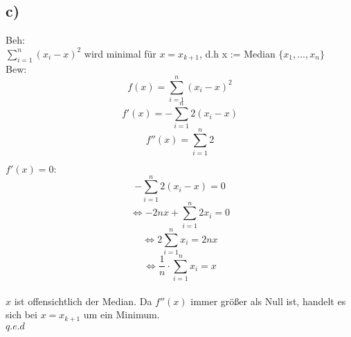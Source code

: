 \documentclass[a4paper,11pt,twoside]{article}
\begin{document}
\subsection*{c)}

Beh:\\ $\sum_{i=1}^{n} (x_i-x)^2$ wird minimal für $x = x_{k+1}$, d.h x := Median $\{x_1, ..., x_n\}$\\

Bew: \\
\[f(x) = \sum_{i=1}^{n} (x_i -x)^2\]
\[f'(x) = -\sum_{i=1}^{n} 2(x_i -x)\]
\[f''(x) = \sum_{i=1}^{n} 2\]

\underline{$f'(x)=0:$}\\
\[-\sum_{i=1}^{n}2(x_i -x) = 0\]
\[\Leftrightarrow -2nx + \sum_{i=1}^{n}2x_i = 0\]
\[\Leftrightarrow 2\sum_{i=1}^{n}x_i = 2nx\]
\[\Leftrightarrow \frac{1}{n} \cdot \sum_{i=1}^{n}x_i = x\]\\

$x$ ist offensichtlich der Median. Da $f''(x)$ immer größer als Null ist, handelt es sich bei $x=x_{k+1}$ um ein Minimum.\\
$q.e.d$
\end{document}
